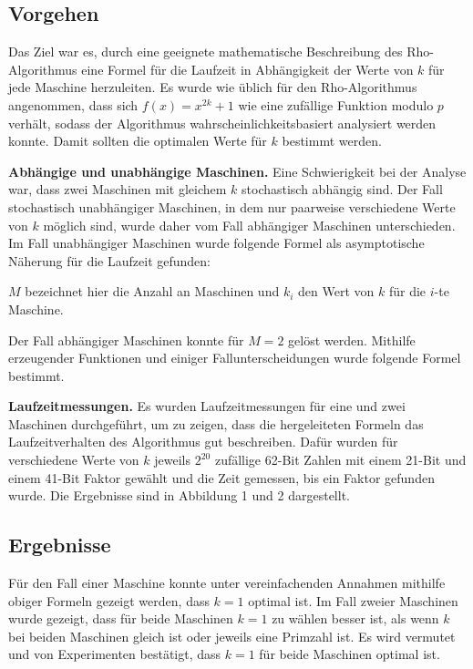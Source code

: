 \documentclass[a4paper, extrafontsizes, ngerman, 25pt]{memoir}
\begin{document}
\newpage

\subsection{Vorgehen}

Das Ziel war es, durch eine geeignete mathematische Beschreibung des Rho-Algorithmus eine Formel für die Laufzeit in Abhängigkeit der Werte von $k$ für jede Maschine herzuleiten. Es wurde wie üblich für den Rho-Algorithmus angenommen, dass sich $f(x) = x^{2k} + 1$ wie eine zufällige Funktion modulo $p$ verhält, sodass der Algorithmus wahrscheinlichkeitsbasiert analysiert werden konnte. Damit sollten die optimalen Werte für $k$ bestimmt werden.

\vspace{0.5cm}
\noindent \textbf{Abhängige und unabhängige Maschinen.} Eine Schwierigkeit bei der Analyse war, dass zwei Maschinen mit gleichem $k$ stochastisch abhängig sind. Der Fall stochastisch unabhängiger Maschinen, in dem nur paarweise verschiedene Werte von $k$ möglich sind, wurde daher vom Fall abhängiger Maschinen unterschieden. Im Fall unabhängiger Maschinen wurde folgende Formel als asymptotische Näherung für die Laufzeit gefunden:

\begin{figure}[H]
    \hspace{3.5cm} 
\end{figure}

\noindent $M$ bezeichnet hier die Anzahl an Maschinen und $k_i$ den Wert von $k$ für die $i$-te Maschine.

Der Fall abhängiger Maschinen konnte für $M = 2$ gelöst werden. Mithilfe erzeugender Funktionen und einiger Fallunterscheidungen wurde folgende Formel bestimmt.

\begin{figure}[H]
    \centering
    
\end{figure}

\noindent \textbf{Laufzeitmessungen.} Es wurden Laufzeitmessungen für eine und zwei Maschinen durchgeführt, um zu zeigen, dass die hergeleiteten Formeln das Laufzeitverhalten des Algorithmus gut beschreiben. Dafür wurden für verschiedene Werte von $k$ jeweils $2^{20}$ zufällige 62-Bit Zahlen mit einem 21-Bit und einem 41-Bit Faktor gewählt und die Zeit gemessen, bis ein Faktor gefunden wurde. Die Ergebnisse sind in Abbildung 1 und 2 dargestellt.

\subsection{Ergebnisse}

Für den Fall einer Maschine konnte unter vereinfachenden Annahmen mithilfe obiger Formeln gezeigt werden, dass $k = 1$ optimal ist. Im Fall zweier Maschinen wurde gezeigt, dass für beide Maschinen $k = 1$ zu wählen besser ist, als wenn $k$ bei beiden Maschinen gleich ist oder jeweils eine Primzahl ist. Es wird vermutet und von Experimenten bestätigt, dass $k = 1$ für beide Maschinen optimal ist.
\end{document}
